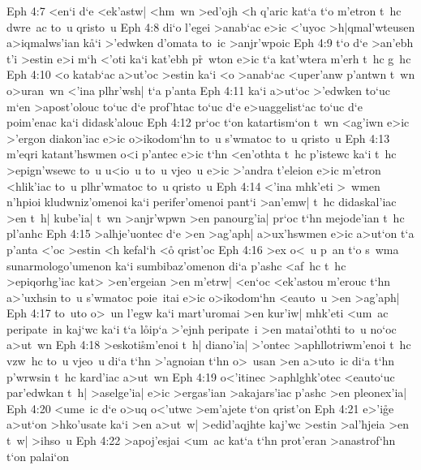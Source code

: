\vs Eph 4:7
<en`i
d`e
<ek'astw|
<hm~wn
>ed'ojh
<h
q'aric
kat`a
t`o
m'etron
t~hc
dwre~ac
to~u
qristo~u\bibvsend
\vs Eph 4:8
di`o
l'egei
>anab`ac
e>ic
<'uyoc
>h|qmal'wteusen
a>iqmalws'ian
k\r{a}`i
>'edwken
d'omata
to~ic
>anjr'wpoic\bibvsend
\vs Eph 4:9
t`o
d`e
>an'ebh
t'i
>estin
e>i
m`h
<'oti
ka`i
kat'ebh
p\r{r}~wton
e>ic
t`a
kat'wtera
m'erh
t~hc
g~hc\bibvsend
\vs Eph 4:10
<o
katab`ac
a>ut'oc
>estin
ka`i
<o
>anab`ac
<uper'anw
p'antwn
t~wn
o>uran~wn
<'ina
plhr'wsh|
t`a
p'anta\bibvsend
\vs Eph 4:11
ka`i
a>ut`oc
>'edwken
to`uc
m`en
>apost'olouc
to`uc
d`e
prof'htac
to`uc
d`e
e>uaggelist`ac
to`uc
d`e
poim'enac
ka`i
didask'alouc\bibvsend
\vs Eph 4:12
pr`oc
t`on
katartism`on
t~wn
<ag'iwn
e>ic
>'ergon
diakon'iac
e>ic
o>ikodom`hn
to~u
s'wmatoc
to~u
qristo~u\bibvsend
\vs Eph 4:13
m'eqri
katant'hswmen
o<i
p'antec
e>ic
t`hn
<en'othta
t~hc
p'istewc
ka`i
t~hc
>epign'wsewc
to~u
u<io~u
to~u
vjeo~u
e>ic
>'andra
t'eleion
e>ic
m'etron
<hlik'iac
to~u
plhr'wmatoc
to~u
qristo~u\bibvsend
\vs Eph 4:14
<'ina
mhk'eti
>~wmen
n'hpioi
kludwniz'omenoi
ka`i
perifer'omenoi
pant`i
>an'emw|
t~hc
didaskal'iac
>en
t~h|
kube'ia|
t~wn
>anjr'wpwn
>en
panourg'ia|
pr`oc
t`hn
mejode'ian
t~hc
pl'anhc\bibvsend
\vs Eph 4:15
>alhje'uontec
d`e
>en
>ag'aph|
a>ux'hswmen
e>ic
a>ut`on
t`a
p'anta
<'oc
>estin
<h
kefal`h
<o\r{}
qrist'oc\bibvsend
\vs Eph 4:16
>ex
o<~u
p~an
t`o
s~wma
sunarmologo'umenon
ka`i
sumbibaz'omenon
di`a
p'ashc
<af~hc
t~hc
>epiqorhg'iac
kat>
>en'ergeian
>en
m'etrw|
<en`oc
<ek'astou
m'erouc
t`hn
a>'uxhsin
to~u
s'wmatoc
poie~itai
e>ic
o>ikodom`hn
<eauto~u
>en
>ag'aph|\bibvsend
\vs Eph 4:17
to~uto
o>~un
l'egw
ka`i
mart'uromai
>en
kur'iw|
mhk'eti
<um~ac
peripate~in
kaj`wc
ka`i
t`a
l\r{o}ip`a
>'ejnh
peripate~i
>en
matai'othti
to~u
no`oc
a>ut~wn\bibvsend
\vs Eph 4:18
>eskoti\r{s}m'enoi
t~h|
diano'ia|
>'ontec
>aphllotriwm'enoi
t~hc
vzw~hc
to~u
vjeo~u
di`a
t`hn
>'agnoian
t`hn
o>~usan
>en
a>uto~ic
di`a
t`hn
p'wrwsin
t~hc
kard'iac
a>ut~wn\bibvsend
\vs Eph 4:19
o<'itinec
>aphlghk'otec
<eauto`uc
par'edwkan
t~h|
>aselge'ia|
e>ic
>ergas'ian
>akajars'iac
p'ashc
>en
pleonex'ia|\bibvsend
\vs Eph 4:20
<ume~ic
d`e
o>uq
o<'utwc
>em'ajete
t`on
qrist'on\bibvsend
\vs Eph 4:21
e>'i\r{g}e
a>ut`on
>hko'usate
ka`i
>en
a>ut~w|
>edid'aqjhte
kaj'wc
>estin
>al'hjeia
>en
t~w|
>ihso~u\bibvsend
\vs Eph 4:22
>apoj'esjai
<um~ac
kat`a
t`hn
prot'eran
>anastrof`hn
t`on
palai`on
